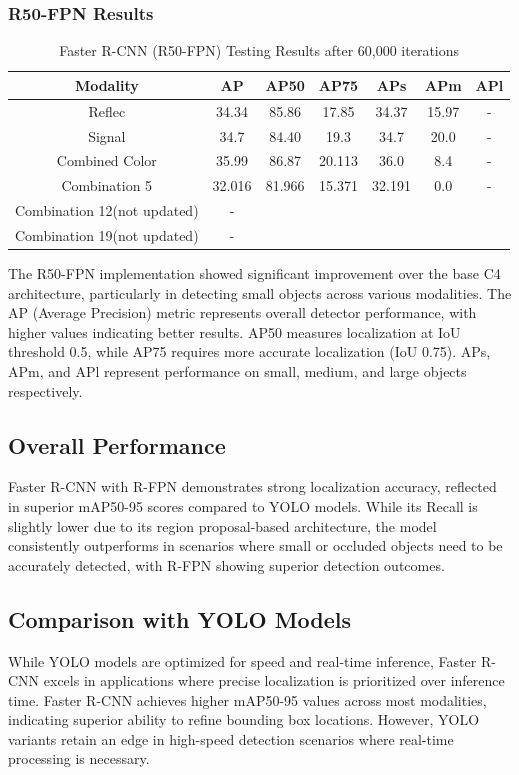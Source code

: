 \documentclass[11pt]{article}
\begin{document}
\subsubsection{R50-FPN Results}
\begin{table}[h!]
    \centering
    \small
    \caption{Faster R-CNN (R50-FPN) Testing Results after 60,000 iterations}
    \begin{tabular}{ccccccc}
        \toprule
        Modality & AP & AP50 & AP75 & APs & APm & APl \\
        \midrule
        Reflec & 34.34 & 85.86 & 17.85 & 34.37 & 15.97 & - \\
        Signal & 34.7 & 84.40 & 19.3 & 34.7 & 20.0 & - \\
        Combined Color & 35.99 & 86.87 & 20.113 & 36.0 & 8.4 & - \\
        Combination 5 & 32.016 & 81.966 & 15.371 & 32.191 & 0.0 &- \\
        
        Combination 12(not updated) & - \\
        Combination 19(not updated) & - \\

        \bottomrule
    \end{tabular}
    \label{tab:faster_rcnn_r50fpn_results}
\end{table}

\noindent The R50-FPN implementation showed significant improvement over the base C4 architecture, particularly in detecting small objects across various modalities. The AP (Average Precision) metric represents overall detector performance, with higher values indicating better results. AP50 measures localization at IoU threshold 0.5, while AP75 requires more accurate localization (IoU 0.75). APs, APm, and APl represent performance on small, medium, and large objects respectively.

\subsection{Overall Performance}
Faster R-CNN with R-FPN demonstrates strong localization accuracy, reflected in superior mAP50-95 scores compared to YOLO models. While its Recall is slightly lower due to its region proposal-based architecture, the model consistently outperforms in scenarios where small or occluded objects need to be accurately detected, with R-FPN showing superior detection outcomes.

\subsection{Comparison with YOLO Models}
While YOLO models are optimized for speed and real-time inference, Faster R-CNN excels in applications where precise localization is prioritized over inference time. Faster R-CNN achieves higher mAP50-95 values across most modalities, indicating superior ability to refine bounding box locations. However, YOLO variants retain an edge in high-speed detection scenarios where real-time processing is necessary.
\end{document}
